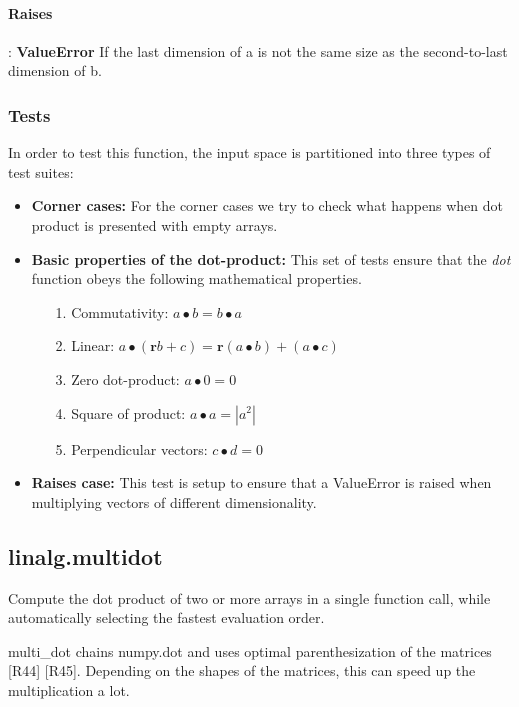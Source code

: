 \documentclass[a4paper,11pt]{article}
\begin{document}
\paragraph{Raises}:
\textbf{ValueError}
If the last dimension of a is not the same size as the second-to-last dimension of b.

\subsubsection{Tests}
In order to test this function, the input space is partitioned into three types of test suites:

\begin{itemize}
	\item \textbf{Corner cases:} For the corner cases we try to check what happens when dot product is presented with empty arrays.
	
	\item \textbf{Basic properties of the dot-product:} This set of tests ensure that the \textit{dot} function obeys the following mathematical properties.
	\begin{itemize}
		\item[1.] Commutativity: $ a \bullet b = b \bullet a $ 
		\item[2.] Linear: $ a \bullet (\textbf{r}b + c) = \textbf{r}(a \bullet b) + (a \bullet c) $
		\item[3.] Zero dot-product: $ a \bullet 0 = 0 $
		\item[4.] Square of product: $ a \bullet a = | a^2 |$
		\item[5.] Perpendicular vectors: $ c \bullet d = 0$
	\end{itemize}
	
	\item \textbf{Raises case:} This test is setup to ensure that a ValueError is raised when multiplying vectors of different dimensionality.
\end{itemize}

\subsection{linalg.multidot}
Compute the dot product of two or more arrays in a single function call, while automatically selecting the fastest evaluation order.

multi\_dot chains numpy.dot and uses optimal parenthesization of the matrices [R44] [R45]. Depending on the shapes of the matrices, this can speed up the multiplication a lot.
\end{document}

